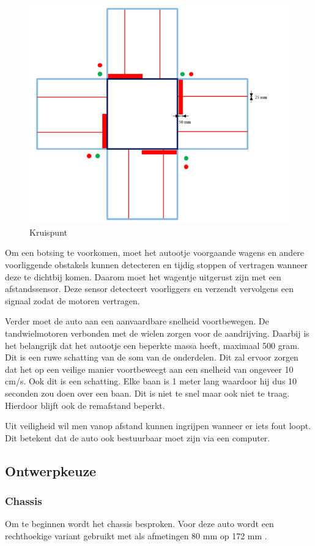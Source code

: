 \documentclass[a4paper,twoside,kulak]{kulakreport} %
\begin{document}
\begin{figure}
	\centering
	\includegraphics[width=.6\textwidth]{volglijnenEnStoplijnen}
	\caption{Kruispunt}
	\label{fig:plattegrond}
\end{figure}

Om een botsing te voorkomen, moet het autootje voorgaande wagens en andere voorliggende obstakels kunnen detecteren en tijdig stoppen of vertragen wanneer deze te dichtbij komen. Daarom moet het wagentje uitgerust zijn met een afstandssensor. Deze sensor detecteert voorliggers en verzendt vervolgens een signaal zodat de motoren vertragen. 

Verder moet de auto aan een aanvaardbare snelheid voortbewegen. De tandwielmotoren verbonden met de wielen zorgen voor de aandrijving. Daarbij is het belangrijk dat het autootje een beperkte massa heeft, maximaal 500 gram. Dit is een ruwe schatting van de som van de onderdelen. Dit zal ervoor zorgen dat het op een veilige manier voortbeweegt aan een snelheid van ongeveer 10 cm/s. Ook dit is een schatting. Elke baan is 1 meter lang waardoor hij dus 10 seconden zou doen over een baan. Dit is niet te snel maar ook niet te traag. Hierdoor blijft ook de remafstand beperkt.

Uit veiligheid wil men vanop afstand kunnen ingrijpen wanneer er iets fout loopt. Dit betekent dat de auto ook bestuurbaar moet zijn via een computer. 



\subsection{Ontwerpkeuze}
\label{Ontwerpskeuze}

\subsubsection{Chassis}
Om te beginnen wordt het chassis besproken. Voor deze auto wordt een rechthoekige variant gebruikt met als afmetingen 80 mm op 172 mm  \cite{RobotChassisRechthoekigZwart}. 
\end{document}
